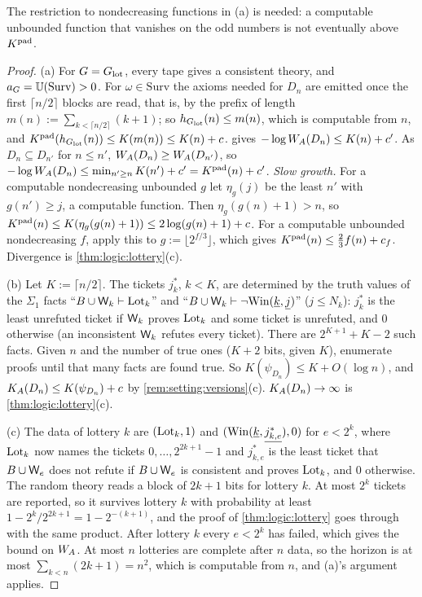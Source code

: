 The restriction to nondecreasing functions in (a) is needed: a computable unbounded function that vanishes on the odd numbers is not eventually above $K^{\mathrm{pad}}$.

\begin{proof}
(a) For $G=G_{\mathrm{lot}}$, every tape gives a consistent theory, and $a_G=\mathbb{U}(\mathrm{Surv})>0$. For $\omega\in\mathrm{Surv}$ the axioms needed for $D_n$ are emitted once the first $\lceil n/2\rceil$ blocks are read, that is, by the prefix of length $m(n):=\sum_{k<\lceil n/2\rceil}(k+1)$; so $h_{G_{\mathrm{lot}}}(n)\le m(n)$, which is computable from $n$, and $K^{\mathrm{pad}}(h_{G_{\mathrm{lot}}}(n))\le K(m(n))\le K(n)+c$.  gives $-\log W_{A}(D_n)\le K(n)+c'$. As $D_n\subseteq D_{n'}$ for $n\le n'$, $W_{A}(D_n)\ge W_{A}(D_{n'})$, so $-\log W_{A}(D_n)\le\min_{n'\ge n}K(n')+c'=K^{\mathrm{pad}}(n)+c'$. \emph{Slow growth.} For a computable nondecreasing unbounded $g$ let $\eta_g(j)$ be the least $n'$ with $g(n')\ge j$, a computable function. Then $\eta_g(g(n)+1)>n$, so $K^{\mathrm{pad}}(n)\le K(\eta_g(g(n)+1))\le2\log(g(n)+1)+c$. For a computable unbounded nondecreasing $f$, apply this to $g:=\lfloor2^{f/3}\rfloor$, which gives $K^{\mathrm{pad}}(n)\le\frac23f(n)+c_f$. Divergence is \cref{thm:logic:lottery}(c).

(b) Let $K:=\lceil n/2\rceil$. The tickets $j^*_k$, $k<K$, are determined by the truth values of the $\Sigma_1$ facts ``$B\cup\mathsf{W}_{k}\vdash\mathrm{Lot}_k$'' and ``$B\cup\mathsf{W}_{k}\vdash\neg\mathrm{Win}(\underline{k},\underline{j})$'' ($j\le N_k$): $j^*_k$ is the least unrefuted ticket if $\mathsf{W}_{k}$ proves $\mathrm{Lot}_k$ and some ticket is unrefuted, and $0$ otherwise (an inconsistent $\mathsf{W}_{k}$ refutes every ticket). There are $2^{K+1}+K-2$ such facts. Given $n$ and the number of true ones ($K+2$ bits, given $K$), enumerate proofs until that many facts are found true. So $K(\psi_{D_n})\le K+O(\log n)$, and $K_{A}(D_n)\le K(\psi_{D_n})+c$ by \cref{rem:setting:versions}(c). $K_{A}(D_n)\to\infty$ is \cref{thm:logic:lottery}(c).

(c) The data of lottery $k$ are $(\mathrm{Lot}_k,1)$ and $(\mathrm{Win}(\underline{k},\underline{j^*_{k,e}}),0)$ for $e<2^k$, where $\mathrm{Lot}_k$ now names the tickets $0,\dots,2^{2k+1}-1$ and $j^*_{k,e}$ is the least ticket that $B\cup\mathsf{W}_{e}$ does not refute if $B\cup\mathsf{W}_{e}$ is consistent and proves $\mathrm{Lot}_k$, and $0$ otherwise. The random theory reads a block of $2k+1$ bits for lottery $k$. At most $2^k$ tickets are reported, so it survives lottery $k$ with probability at least $1-2^k/2^{2k+1}=1-2^{-(k+1)}$, and the proof of \cref{thm:logic:lottery} goes through with the same product. After lottery $k$ every $e<2^k$ has failed, which gives the bound on $W_{A}$. At most $n$ lotteries are complete after $n$ data, so the horizon is at most $\sum_{k<n}(2k+1)=n^2$, which is computable from $n$, and (a)'s argument applies.
\end{proof}

